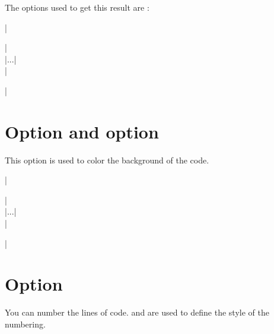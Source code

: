 \documentclass[DIV         = 14,
               fontsize    = 10,
               index       = totoc,
               twoside,
               cadre,
               headings    = small,
               ]{tkz-doc}
\begin{document}
\vspace{24pt}
The options used to get this result are :
\vspace{12pt}

|\begin{tkzexample}[overhang,width=6cm,code=red!30]|\\
|...|                                               \\
|\end{tkzexample}|   \\


\newpage
\section{Option  and option }

This option is used to color the background of the code.

\vspace{24pt}

|\begin{tkzexample}[overhang,width=9cm,code=gray!20,graphic=red!15]|\\
|...|                                               \\
|\end{tkzexample}|   \\

\begin{tkzexample}[overhang,width=9cm,code=gray!20,graphic=red!15]
\end{tkzexample}


\newpage
\section{Option }

You can number the lines of code.  and  are used to define the style of the numbering. 
\end{document}
